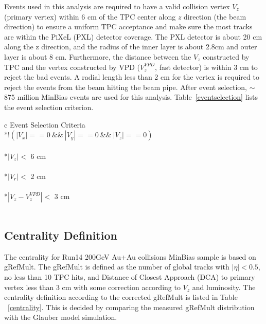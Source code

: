 \documentclass[a4paper]{article}
\begin{document}
Events used in this analysis are required to have a valid collision vertex $V_{z}$ (primary vertex) within 6 cm of the TPC center along $z$ direction (the beam direction) to ensure a uniform TPC acceptance and make sure the most tracks are within the PiXeL (PXL) detector coverage. The PXL detector is about 20 cm along the z direction, and the radius of the inner layer is about 2.8cm and outer layer is about 8 cm. Furthermore, the distance between the $V_{z}$ constructed by TPC and the vertex constructed by VPD ($V_{z}^{VPD}$, fast detector) is within 3 cm to reject the bad events. A radial length less than 2 cm for the vertex is required to reject the events from the beam hitting the beam pipe. After event selection, $\sim$875 million MinBias events are used for this analysis. Table~\ref{eventselection} lists the event selection criterion.

\begin{table}[htp]
\centering
\caption{Event selection in Au+Au collisions at 200 GeV for $D^0$.}
\label{eventselection}
\begin{tabular}{c}
\toprule[1.6pt]
Event Selection Criteria \\
\midrule[1.2pt]
*{$!(|V_{x}|== 0 \ \&\& \ |V_{y}|== 0 \  \&\& \  |V_{z}|== 0) $ } \\
\\
*{$|V_{z}|<$ 6 cm} \\
\\
*{$|V_{r}|<$ 2 cm} \\
\\
*{$|V_{z} - V_{z}^{VPD}|<$ 3 cm} \\ 
\\  
\bottomrule[1.6pt]
\end{tabular}
\end{table}

\subsection{Centrality Definition}

The centrality for Run14 200GeV Au+Au collisions MinBias sample is based on gRefMult. The gRefMult is defined as the number of global tracks with $|\eta|<0.5$, no less than 10 TPC hits, and Distance of Closest Approach (DCA) to primary vertex less than 3 cm with some correction according to $V_{z}$ and luminosity. The centrality definition according to the corrected gRefMult is listed in Table ~\ref{centrality}. This is decided by comparing the measured gRefMult distribution with the Glauber model simulation. 
\end{document}
